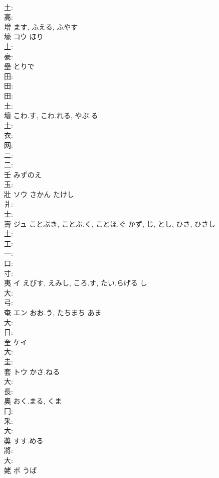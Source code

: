 \documentclass[8pt]{extreport}
\begin{document}
\begin{CJK}{UTF8}{min}
\\	土: 
\\	高: 
\\	增		ます, ふえる, ふやす				
\\	壕	コウ	ほり		
\\	土: 
\\	豪: 
\\	壘		とりで				
\\	田: 
\\	田: 
\\	田: 
\\	土: 
\\	壞		こわ.す, こわ.れる, やぶ.る				
\\	土: 
\\	衣: 
\\	网: 
\\	二: 
\\	二: 
\\	壬		みずのえ				
\\	玉: 
\\	壯	ソウ	さかん	たけし			
\\	爿: 
\\	士: 
\\	壽	ジュ	ことぶき, ことぶ.く, ことほ.ぐ	かず, じ, とし, ひさ, ひさし	
\\	土: 
\\	工: 
\\	一: 
\\	口: 
\\	寸: 
\\	夷	イ	えびす, えみし, ころ.す, たい.らげる	し	
\\	大: 
\\	弓: 
\\	奄	エン	おお.う, たちまち	あま	
\\	大: 
\\	日: 
\\	奎	ケイ			
\\	大: 
\\	圭: 
\\	套	トウ	かさ.ねる		
\\	大: 
\\	長: 
\\	奧		おく.まる, くま				
\\	冂: 
\\	釆: 
\\	大: 
\\	奬		すす.める				
\\	將: 
\\	大: 
\\	姥	ボ	うば		

\end{CJK}
\end{document}
